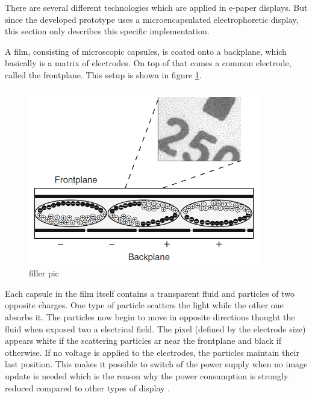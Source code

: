 There are several different technologies which are applied in e-paper displays.
But since the developed prototype uses a microencapsulated electrophoretic display, this section only describes this specific implementation.

A film, consisting of microscopic capsules, is coated onto a backplane, which basically is a matrix of electrodes.
On top of that comes a common electrode, called the frontplane.
This setup is shown in figure \ref{theory:capsules}.

\begin{figure}[h]
	\centering
	\includegraphics[width=0.9\textwidth]{2-theory/e-paper-display/graphics/capsules.png}
	\caption{filler pic\label{theory:capsules}}
\end{figure}

Each capsule in the film itself contains a transparent fluid and particles of two opposite charges.
One type of particle scatters the light while the other one absorbs it.
The particles now begin to move in opposite directions thought the fluid when exposed two a electrical field. 
The pixel (defined by the electrode size) appears white if the scattering particles ar near the frontplane and black if otherwise.
If no voltage is applied to the electrodes, the particles maintain their last position.
This makes it possible to switch of the power supply when no image update is needed which is the reason why the power consumption is strongly reduced compared to other types of display \cite{amundson}.

